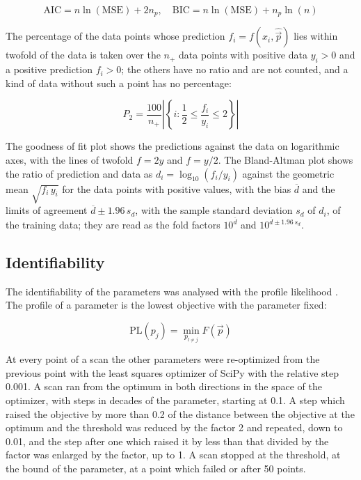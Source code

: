 \documentclass{article}
\begin{document}
\begin{equation}
\mathrm{AIC} = n \ln(\mathrm{MSE}) + 2 n_p, \quad \mathrm{BIC} = n \ln(\mathrm{MSE}) + n_p \ln(n)
\end{equation}

The percentage of the data points whose prediction $f_i = f(x_i, \hat{\vec{p}})$ lies within twofold of the data is taken over the $n_+$ data points with positive data $y_i > 0$ and a positive prediction $f_i > 0$; the others have no ratio and are not counted, and a kind of data without such a point has no percentage:

\begin{equation}
P_2 = \frac{100}{n_+} \left|\left\{ i : \frac{1}{2} \le \frac{f_i}{y_i} \le 2 \right\}\right|
\end{equation}

The goodness of fit plot shows the predictions against the data on logarithmic axes, with the lines of twofold $f = 2y$ and $f = y/2$. The Bland-Altman plot \cite{Bland1986} shows the ratio of prediction and data as $d_i = \log_{10}(f_i / y_i)$ against the geometric mean $\sqrt{f_i\, y_i}$ for the data points with positive values, with the bias $\overline{d}$ and the limits of agreement $\overline{d} \pm 1.96\, s_d$, with the sample standard deviation $s_d$ of $d_i$, of the training data; they are read as the fold factors $10^{\overline{d}}$ and $10^{\overline{d} \pm 1.96\, s_d}$.

\subsection{Identifiability}

The identifiability of the parameters was analysed with the profile likelihood \cite{Raue2009,Kreutz2013}. The profile of a parameter is the lowest objective with the parameter fixed:

\begin{equation}
\mathrm{PL}(p_j) = \min_{p_{l \neq j}} F(\vec{p})
\end{equation}

At every point of a scan the other parameters were re-optimized from the previous point with the least squares optimizer of SciPy with the relative step 0.001. A scan ran from the optimum in both directions in the space of the optimizer, with steps in decades of the parameter, starting at 0.1. A step which raised the objective by more than 0.2 of the distance between the objective at the optimum and the threshold was reduced by the factor 2 and repeated, down to 0.01, and the step after one which raised it by less than that divided by the factor was enlarged by the factor, up to 1. A scan stopped at the threshold, at the bound of the parameter, at a point which failed or after 50 points.
\end{document}
